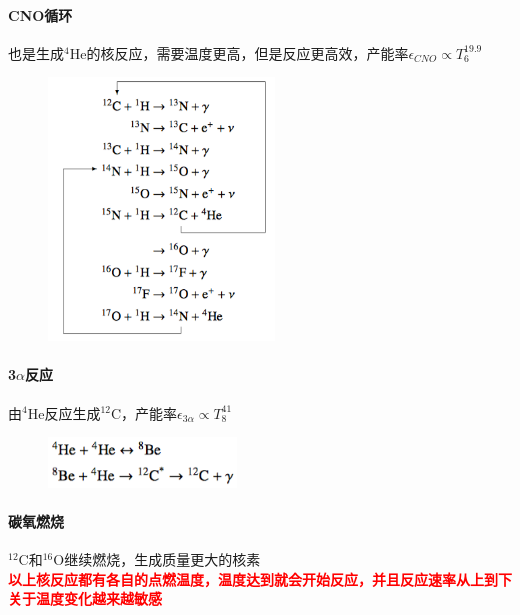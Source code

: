 \paragraph{CNO循环}
也是生成$^4$He的核反应，需要温度更高，但是反应更高效，产能率$\epsilon_{CNO}\propto T_6^{19.9}$
\begin{figure}[hbt]
  \centering
  \includegraphics[width=6cm]{chapters/10/cno}
  \label{}
\end{figure}

\paragraph{3$\alpha$反应}
由$^4$He反应生成$^{12}$C，产能率$\epsilon_{3\alpha}\propto T_8^{41}$
\begin{figure}[hbt]
  \centering
  \includegraphics[width=5cm]{chapters/10/3alpha}
  \label{}
\end{figure}



\paragraph{碳氧燃烧}
$^{12}$C和$^{16}$O继续燃烧，生成质量更大的核素\\
\newline
\textcolor{red}{\bf 以上核反应都有各自的点燃温度，温度达到就会开始反应，并且反应速率从上到下关于温度变化越来越敏感}


